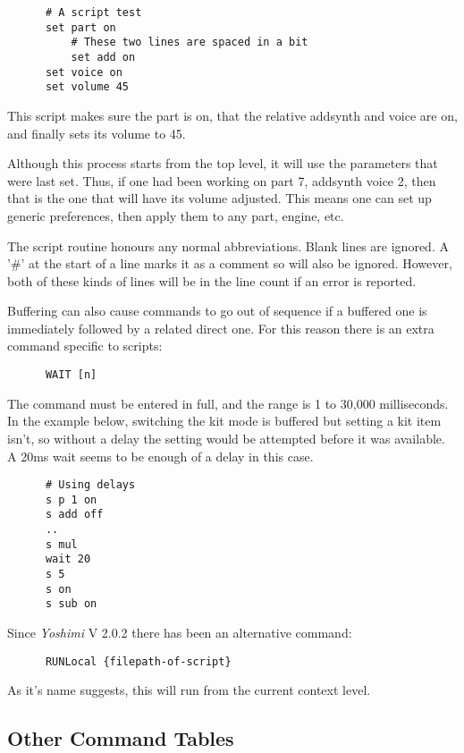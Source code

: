    \begin{verbatim}
      # A script test
      set part on
          # These two lines are spaced in a bit
          set add on
      set voice on
      set volume 45
   \end{verbatim}

   This script makes sure the part is on, that the relative addsynth and
   voice are on, and finally sets its volume to 45.

   Although this process starts from the top level, it will use the
   parameters that were last set. Thus, if one had been working on part 7,
   addsynth voice 2, then that is the one that will have its volume adjusted.
   This means one can set up generic preferences, then apply them to any
   part, engine, etc.

   The script routine honours any normal abbreviations. Blank lines are
   ignored. A '\#' at the start of a line marks it as a comment so will also
   be ignored. However, both of these kinds of lines will be in the line
   count if an error is reported.

   Buffering can also cause commands to go out of sequence if a buffered one
   is immediately followed by a related direct one. For this reason there is
   an extra command specific to scripts:

   \begin{verbatim}
      WAIT [n]
   \end{verbatim}

   The command must be entered in full, and the range is 1 to 30,000
   milliseconds.
   In the example below, switching the kit mode is buffered but setting a kit
   item isn't, so without a delay the setting would be attempted before it
   was available. A 20ms wait seems to be enough of a delay in this case.
   \begin{verbatim}
      # Using delays
      s p 1 on
      s add off
      ..
      s mul
      wait 20
      s 5
      s on
      s sub on
   \end{verbatim}

   Since \textsl{Yoshimi} V 2.0.2 there has been an alternative command:
   \begin{verbatim}
      RUNLocal {filepath-of-script}
   \end{verbatim}
   As it's name suggests, this will run from the current context level.

\subsection{Other Command Tables}
\label{subsec:command_line_other_command_tables}

